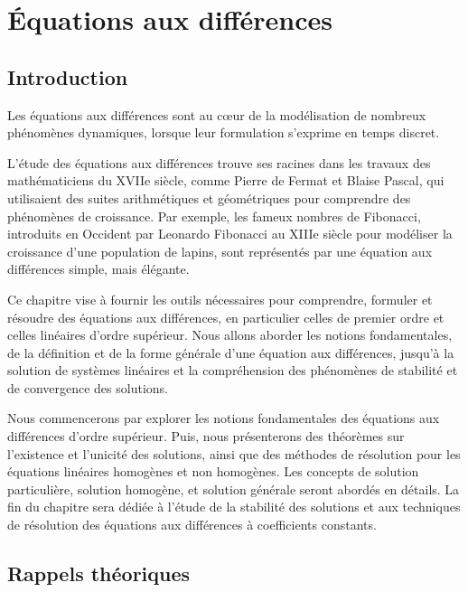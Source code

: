 \chapter{Équations aux différences}
    \section{Introduction}
        Les équations aux différences sont au cœur de la modélisation de nombreux phénomènes dynamiques, lorsque leur formulation s'exprime en temps discret.

        L’étude des équations aux différences trouve ses racines dans les travaux des mathématiciens du XVIIe siècle, comme Pierre de Fermat et Blaise Pascal, qui utilisaient des suites arithmétiques et géométriques pour comprendre des phénomènes de croissance. Par exemple, les fameux nombres de Fibonacci, introduits en Occident par Leonardo Fibonacci au XIIIe siècle pour modéliser la croissance d’une population de lapins, sont représentés par une équation aux différences simple, mais élégante.

        Ce chapitre vise à fournir les outils nécessaires pour comprendre, formuler et résoudre des équations aux différences, en particulier celles de premier ordre et celles linéaires d'ordre supérieur. Nous allons aborder les notions fondamentales, de la définition et de la forme générale d'une équation aux différences, jusqu’à la solution de systèmes linéaires et la compréhension des phénomènes de stabilité et de convergence des solutions.
        
        Nous commencerons par explorer les notions fondamentales des équations aux différences d’ordre supérieur. Puis, nous présenterons des théorèmes sur l'existence et l'unicité des solutions, ainsi que des méthodes de résolution pour les équations linéaires homogènes et non homogènes. Les concepts de solution particulière, solution homogène, et solution générale seront abordés en détails. La fin du chapitre sera dédiée à l’étude de la stabilité des solutions et aux techniques de résolution des équations aux différences à coefficients constants. 
        
    \section{Rappels théoriques}
